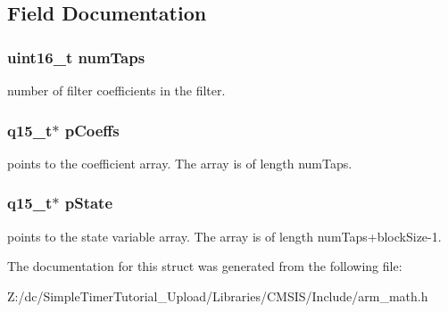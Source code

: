 \subsection{Field Documentation}
\hypertarget{structarm__fir__instance__q15_a751941891e47f522a7f5375fe8990aac}{
\subsubsection[{num\-Taps}]{\setlength{\rightskip}{0pt plus 5cm}uint16\-\_\-t num\-Taps}}\label{structarm__fir__instance__q15_a751941891e47f522a7f5375fe8990aac}
number of filter coefficients in the filter. \hypertarget{structarm__fir__instance__q15_a7ca181a37f714d174445f486bebce26f}{
\subsubsection[{p\-Coeffs}]{\setlength{\rightskip}{0pt plus 5cm}q15\-\_\-t$\ast$ p\-Coeffs}}\label{structarm__fir__instance__q15_a7ca181a37f714d174445f486bebce26f}
points to the coefficient array. The array is of length num\-Taps. \hypertarget{structarm__fir__instance__q15_ae29dfdb736374fcddaeaec4b7770170c}{
\subsubsection[{p\-State}]{\setlength{\rightskip}{0pt plus 5cm}q15\-\_\-t$\ast$ p\-State}}\label{structarm__fir__instance__q15_ae29dfdb736374fcddaeaec4b7770170c}
points to the state variable array. The array is of length num\-Taps+block\-Size-\/1. 

The documentation for this struct was generated from the following file\-:\begin{DoxyCompactItemize}
\item 
Z\-:/dc/\-Simple\-Timer\-Tutorial\-\_\-\-Upload/\-Libraries/\-C\-M\-S\-I\-S/\-Include/arm\-\_\-math.\-h\end{DoxyCompactItemize}
